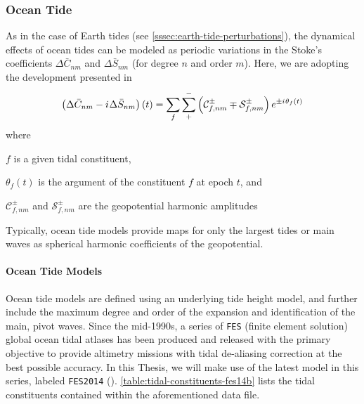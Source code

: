 \subsubsection{Ocean Tide}\label{sssec:ocean-tide-perturbations}

As in the case of Earth tides (see \ref{sssec:earth-tide-perturbations}), the 
dynamical effects of ocean tides can be modeled as periodic variations in the 
Stoke's coefficients $\Delta \bar{C}_{nm}$ and $\Delta \bar{S}_{nm}$ (for 
degree $n$ and order $m$). Here, we are adopting the development presented in 
\cite{iers2010}
\begin{equation}
  \label{eq:iers10615}
  \left( \Delta \bar{C}_{nm} - {i\mkern1mu} \Delta \bar{S}_{nm} \right) (t) =
    \sum_{f} \sum_{+}^{-} \left( 
      \mathcal{C}_{f,nm}^{\pm} \mp \mathcal{S}_{f,nm}^{\pm} \right)
    e^{\pm {i\mkern1mu} \theta _f (t)}
\end{equation}
where
\begin{description}
  \item $f$ is a given tidal constituent,
  \item $\theta _f (t)$ is the argument of the constituent $f$ at epoch $t$, and
  \item $\mathcal{C}_{f,nm}^{\pm}$ and $\mathcal{S}_{f,nm}^{\pm}$ are the geopotential 
    harmonic amplitudes
\end{description}

Typically, ocean tide models provide maps for only the largest tides or main waves 
as spherical harmonic coefficients of the geopotential.

\paragraph{Ocean Tide Models}\label{par:ocean-tide-models}

Ocean tide models are defined using an underlying tide height model, and further 
include the  maximum degree and order of the expansion and identification of the 
main, pivot waves. Since the mid-1990s, a series of \texttt{FES} (finite element 
solution) global ocean tidal atlases has been produced and released with the primary 
objective to provide altimetry missions with tidal de-aliasing correction at the 
best possible accuracy. In this Thesis, we will make use of the latest model in 
this series, labeled \texttt{FES2014} (\cite{Lyard2021}). \ref{table:tidal-constituents-fes14b} 
lists the tidal constituents contained within the aforementioned data file.

